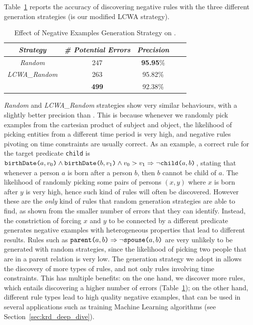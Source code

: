 Table~\ref{tab:random_neg_examples} reports the accuracy of discovering negative rules with the three different generation strategies (\krd is our modified LCWA strategy).
\begin{table}[t]
	\centering
	\caption{Effect of Negative Examples Generation Strategy on \dbpedia.}
	\label{tab:random_neg_examples}
	\begin{tabular}{|c|c|c|c|c|}
		\hline
		\hline
		{\it Strategy}&{\it \# Potential Errors} & {\it Precision} \tabularnewline
		\hline
		\emph{Random} & 247 & \textbf{95.95}\%\tabularnewline
		\emph{LCWA\_Random} & 263 & 95.82\% \tabularnewline
		\krd & \textbf{499} & 92.38\%\tabularnewline
		\hline
	\end{tabular}
\end{table}
\emph{Random} and \emph{LCWA\_Random} strategies show very similar behaviours, with a slightly better precision than \krd. This is because whenever we randomly pick examples from the cartesian product of subject and object, the likelihood of picking entities from a different time period is very high, and negative rules pivoting on time constraints are usually correct.
As an example, a correct rule for the target predicate \texttt{child} is $\texttt{birthDate(}a,v_0\texttt{)} \wedge \texttt{birthDate(}b,v_1\texttt{)} \wedge v_0 > v_1 \Rightarrow \neg \texttt{child(}a,b\texttt{)}$, stating that whenever a person $a$ is born after a person $b$, then $b$ cannot be child of $a$.
The likelihood of randomly picking some pairs of persons $(x,y)$ where $x$ is born after $y$ is very high, hence such kind of rules will often be discovered. However these are the \emph{only} kind of rules that random generation strategies are able to find, as shown from the smaller number of errors that they can identify. 
Instead, the constriction of forcing $x$ and $y$ to be connected by a different predicate generates  negative examples with heterogeneous properties that lead to different results. Rules such as $\texttt{parent(}a,b\texttt{)} \Rightarrow \neg \texttt{spouse(}a,b\texttt{)}$ are very unlikely to be generated with random strategies, since the likelihood of picking two people that are in a parent relation is very low. The generation strategy we adopt in \krd allows the discovery of more types of rules, and not only rules involving time constraints. This has multiple benefits: on the one hand, we discover more rules, which entails discovering a higher number of errors (Table~\ref{tab:random_neg_examples}); on the other hand, different rule types lead to high quality negative examples, that can be used in several applications such as training Machine Learning algorithms (see Section~\ref{sec:krd_deep_dive}).

